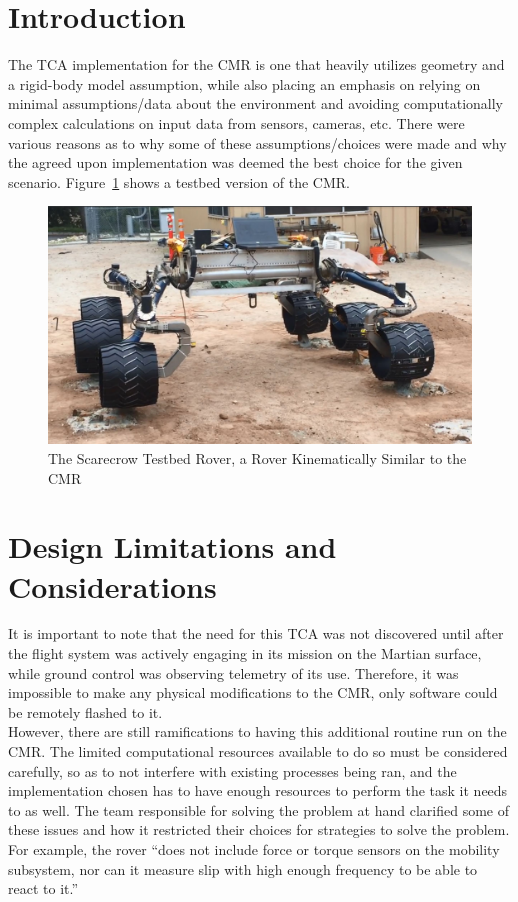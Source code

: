 
\section{Introduction}
The \ac{TCA} implementation for the \ac{CMR} is one that heavily utilizes geometry and a rigid-body model assumption, while also placing an emphasis on relying on minimal assumptions/data about the environment and avoiding computationally complex calculations on input data from sensors, cameras, etc. There were various reasons as to why some of these assumptions/choices were made and why the agreed upon implementation was deemed the best choice for the given scenario. \cite{tractl} Figure~\ref{traction_control:algorithms:scarecrow} shows a testbed version of the \ac{CMR}.

\begin{figure}[htbp]
	\centering
	\includegraphics[width=.9\textwidth]{sections/algorithms/images/scarecrow_testbed.png}
	\caption{The Scarecrow Testbed Rover, a Rover Kinematically Similar to the \acl{CMR} \cite{tractl}}
	\label{traction_control:algorithms:scarecrow}
\end{figure}

\section{Design Limitations and Considerations}
It is important to note that the need for this \ac{TCA} was not discovered until after the flight system was actively engaging in its mission on the Martian surface, while ground control was observing telemetry of its use. Therefore, it was impossible to make any physical modifications to the \ac{CMR}, only software could be remotely flashed to it. \\

However, there are still ramifications to having this additional routine run on the \ac{CMR}. The limited computational resources available to do so must be considered carefully, so as to not interfere with existing processes being ran, and the implementation chosen has to have enough resources to perform the task it needs to as well. The team responsible for solving the problem at hand clarified some of these issues and how it restricted their choices for strategies to solve the problem. For example, the rover ``does not include force or torque sensors on the mobility subsystem, nor can it measure slip with high enough frequency to be able to react to it.'' \cite{tractl} \\

